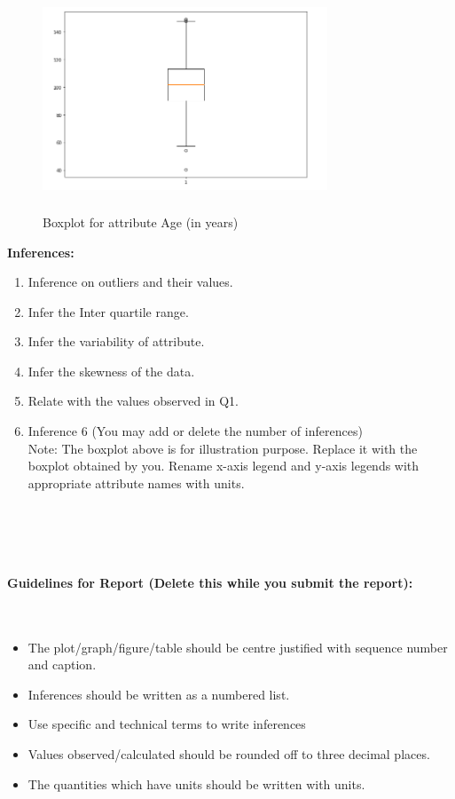 \documentclass[12 pt, a4paper]{article}
\theoremstyle{definition}
\begin{document}
\begin{figure}[H]
	\centering
	\includegraphics[width=8.5cm,height=6.65cm]{boxplot.png}
	\caption{Boxplot for attribute Age (in years)}
	\label{Blockdia}
\end{figure}

\textbf{\Large Inferences:}
\begin{enumerate}
   \item Inference on outliers and their values.
   \item Infer the Inter quartile range.
   \item Infer the variability of attribute.
   \item Infer the skewness of the data.
 \item Relate with the values observed in Q1. \item Inference 6 (You may add or delete the number of inferences)
\\Note: The boxplot above is for illustration purpose. Replace it with the boxplot obtained by you. Rename x-axis legend and y-axis legends with appropriate attribute names with units.

\end{enumerate}
~\\~\\~\\~\\
\bf{\large{{Guidelines for Report (Delete this while you submit the report):\\}}}
\\
~

  \begin{itemize}
  
     \item The plot/graph/figure/table should be centre justified with sequence number and caption.
     \item Inferences should be written as a numbered list.
     \item Use specific and technical terms to write inferences
     \item Values observed/calculated should be rounded off to three decimal places.
     \item The quantities which have units should be written with units.
   \end{itemize}

\end{document}
